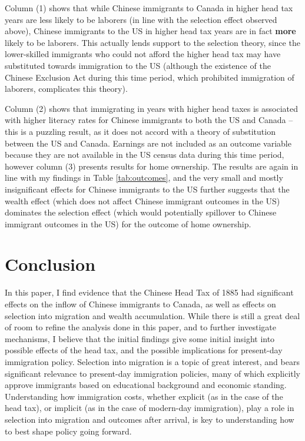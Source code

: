 \documentclass[12pt]{article}
\begin{document}
Column (1) shows that while Chinese immigrants to Canada in higher head tax years are less likely to be laborers (in line with the selection effect observed above), Chinese immigrants to the US in higher head tax years are in fact \textbf{more} likely to be laborers. This actually lends support to the selection theory, since the lower-skilled immigrants who could not afford the higher head tax may have substituted towards immigration to the US (although the existence of the Chinese Exclusion Act during this time period, which prohibited immigration of laborers, complicates this theory). 

Column (2) shows that immigrating in years with higher head taxes is associated with higher literacy rates for Chinese immigrants to both the US and Canada -- this is a puzzling result, as it does not accord with a theory of substitution between the US and Canada. Earnings are not included as an outcome variable because they are not available in the US census data during this time period, however column (3) presents results for home ownership. The results are again in line with my findings in Table \ref{tab:outcomes}, and the very small and mostly insignificant effects for Chinese immigrants to the US further suggests that the wealth effect (which does not affect Chinese immigrant outcomes in the US) dominates the selection effect (which would potentially spillover to Chinese immigrant outcomes in the US) for the outcome of home ownership.

\section{Conclusion}

In this paper, I find evidence that the Chinese Head Tax of 1885 had significant effects on the inflow of Chinese immigrants to Canada, as well as effects on selection into migration and wealth accumulation. While there is still a great deal of room to refine the analysis done in this paper, and to further investigate mechanisms, I believe that the initial findings give some initial insight into possible effects of the head tax, and the possible implications for present-day immigration policy. Selection into migration is a topic of great interest, and bears significant relevance to present-day immigration policies, many of which explicitly approve immigrants based on educational background and economic standing. Understanding how immigration costs, whether explicit (as in the case of the head tax), or implicit (as in the case of modern-day immigration), play a role in selection into migration and outcomes after arrival, is key to understanding how to best shape policy going forward. 


\newpage


\end{document}
